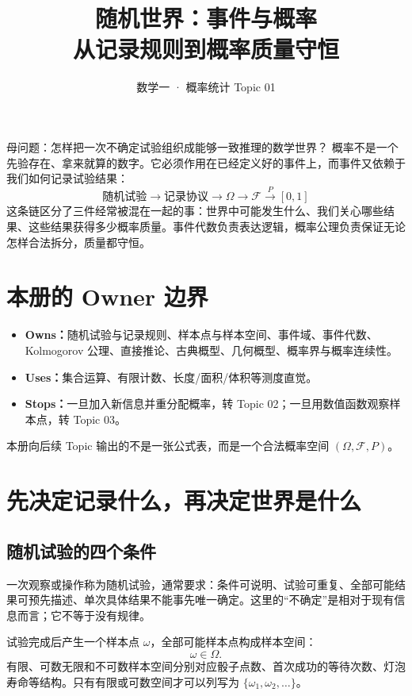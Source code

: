 \documentclass[11pt,a4paper]{ctexart}
\title{\vspace{-1.1cm}\textbf{随机世界：事件与概率}\\[0.4em]
\large 从记录规则到概率质量守恒}
\author{数学一 · 概率统计 Topic 01}
\date{}
\newcommand{\kw}[1]{\textbf{\color{deep}#1}}
\begin{document}
\maketitle

\begin{corebox}{母问题：怎样把一次不确定试验组织成能够一致推理的数学世界？}
概率不是一个先验存在、拿来就算的数字。它必须作用在已经定义好的事件上，而事件又依赖于我们如何记录试验结果：
\[
\boxed{
\text{随机试验}
\longrightarrow \text{记录协议}
\longrightarrow \Omega
\longrightarrow \mathcal F
\xrightarrow{\;P\;}[0,1]
}
\]
这条链区分了三件经常被混在一起的事：世界中可能发生什么、我们关心哪些结果、这些结果获得多少概率质量。事件代数负责表达逻辑，概率公理负责保证无论怎样合法拆分，质量都守恒。
\end{corebox}

\section{本册的 Owner 边界}

\begin{itemize}
  \item \kw{Owns：}随机试验与记录规则、样本点与样本空间、事件域、事件代数、Kolmogorov 公理、直接推论、古典概型、几何概型、概率界与概率连续性。
  \item \kw{Uses：}集合运算、有限计数、长度/面积/体积等测度直觉。
  \item \kw{Stops：}一旦加入新信息并重分配概率，转 Topic 02；一旦用数值函数观察样本点，转 Topic 03。
\end{itemize}

本册向后续 Topic 输出的不是一张公式表，而是一个合法概率空间 $(\Omega,\mathcal F,P)$。

\section{先决定记录什么，再决定世界是什么}

\subsection{随机试验的四个条件}

一次观察或操作称为随机试验，通常要求：条件可说明、试验可重复、全部可能结果可预先描述、单次具体结果不能事先唯一确定。这里的“不确定”是相对于现有信息而言；它不等于没有规律。

试验完成后产生一个样本点 $\omega$，全部可能样本点构成样本空间：
\[
\omega\in\Omega.
\]
有限、可数无限和不可数样本空间分别对应骰子点数、首次成功的等待次数、灯泡寿命等结构。只有有限或可数空间才可以列写为 $\{\omega_1,\omega_2,\ldots\}$。
\end{document}
